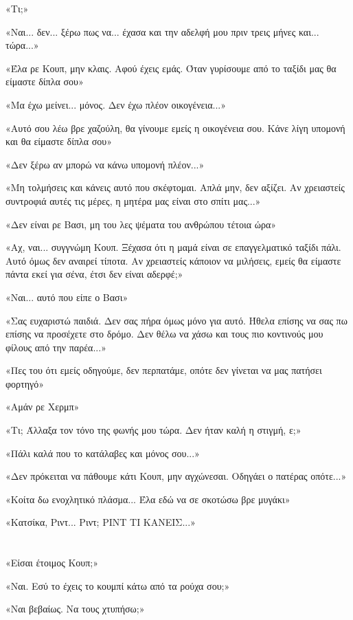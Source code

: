 \documentclass[12pt,twoside, openany]{book}
\begin{document}
«Τι;»

«Ναι... δεν... ξέρω πως να... έχασα και την αδελφή μου πριν τρεις μήνες και... τώρα...»

«Έλα ρε Κουπ, μην κλαις. Αφού έχεις εμάς. Όταν γυρίσουμε από το ταξίδι μας θα είμαστε δίπλα σου»

«Μα έχω μείνει... μόνος. Δεν έχω πλέον οικογένεια...»

«Αυτό σου λέω βρε χαζούλη, θα γίνουμε εμείς η οικογένεια σου. Κάνε λίγη υπομονή και θα είμαστε δίπλα σου»

«Δεν ξέρω αν μπορώ να κάνω υπομονή πλέον...»

«Μη τολμήσεις και κάνεις αυτό που σκέφτομαι. Απλά μην, δεν αξίζει. Αν χρειαστείς συντροφιά αυτές τις μέρες, η μητέρα μας είναι στο σπίτι μας...»

«Δεν είναι ρε Βασι, μη του λες ψέματα του ανθρώπου τέτοια ώρα»

«Αχ, ναι... συγγνώμη Κουπ. Ξέχασα ότι η μαμά είναι σε επαγγελματικό ταξίδι πάλι. Αυτό όμως δεν αναιρεί τίποτα. Αν χρειαστείς κάποιον να μιλήσεις, εμείς θα είμαστε πάντα εκεί για σένα, έτσι δεν είναι αδερφέ;»

«Ναι... αυτό που είπε ο Βασι»

«Σας ευχαριστώ παιδιά. Δεν σας πήρα όμως μόνο για αυτό. Ήθελα επίσης να σας πω επίσης να προσέχετε στο δρόμο. Δεν θέλω να χάσω και τους πιο κοντινούς μου φίλους από την παρέα...»

«Πες του ότι εμείς οδηγούμε, δεν περπατάμε, οπότε δεν γίνεται να μας πατήσει φορτηγό»

«Αμάν ρε Χερμπ»

«Τι; Άλλαξα τον τόνο της φωνής μου τώρα. Δεν ήταν καλή η στιγμή, ε;»

«Πάλι καλά που το κατάλαβες και μόνος σου...»

«Δεν πρόκειται να πάθουμε κάτι Κουπ, μην αγχώνεσαι. Οδηγάει ο πατέρας οπότε...»

«Κοίτα δω ενοχλητικό πλάσμα... Έλα εδώ να σε σκοτώσω βρε μυγάκι»

«Κατσίκα, Ριντ... Ριντ; ΡΙΝΤ ΤΙ ΚΑΝΕΙΣ...»

\chapter{}

«Είσαι έτοιμος Κουπ;»

«Ναι. Εσύ το έχεις το κουμπί κάτω από τα ρούχα σου;»

«Ναι βεβαίως. Να τους χτυπήσω;»
\end{document}
